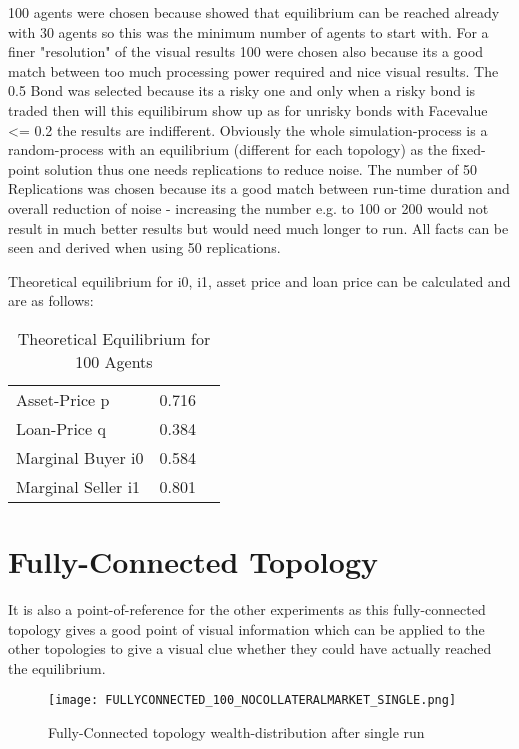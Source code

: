 \documentclass[Bachelorarbeit.tex]{subfiles}
\begin{document}
100 agents were chosen because \cite{Breuer2015} showed that equilibrium can be reached already with 30 agents so this was the minimum number of agents to start with. For a finer "resolution" of the visual results 100 were chosen also because its a good match between too much processing power required and nice visual results.
The 0.5 Bond was selected because its a risky one and only when a risky bond is traded then will this equilibirum show up as for unrisky bonds with Facevalue <= 0.2 the results are indifferent.
Obviously the whole simulation-process is a random-process with an equilibrium (different for each topology) as the fixed-point solution thus one needs replications to reduce noise. The number of 50 Replications was chosen because its a good match between run-time duration and overall reduction of noise - increasing the number e.g. to 100 or 200 would not result in much better results but would need much longer to run. All facts can be seen and derived when using 50 replications.

Theoretical equilibrium for i0, i1, asset price and loan price can be calculated and are as follows:

\begin{table}[h]
	\centering
	\caption{Theoretical Equilibrium for 100 Agents}
	\begin{tabular} { l c r }
		\hline
		Asset-Price p & 0.716 \\
		Loan-Price q & 0.384 \\
		Marginal Buyer i0 & 0.584 \\
		Marginal Seller i1 & 0.801 \\
		\hline
	\end{tabular}
\end{table}





\section{Fully-Connected Topology}


It is also a point-of-reference for the other experiments as this fully-connected topology gives a good point of visual information which can be applied to the other topologies to give a visual clue whether they could have actually reached the equilibrium.

\begin{figure}[!htbp]
	\centering
  \texttt{[image: FULLYCONNECTED\_100\_NOCOLLATERALMARKET\_SINGLE.png]}
	\caption{Fully-Connected topology wealth-distribution after single run}
	\label{fig1}
\end{figure}
\end{document}
